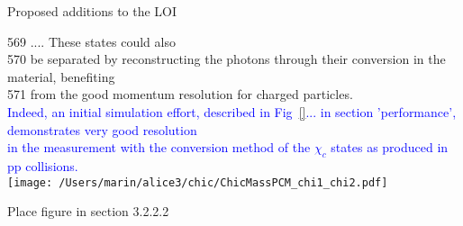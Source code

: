 \documentclass[final,hyperref={pdfpagelabels=false},aspectratio=169,t]{beamer}
\begin{document}
\begin{frame}{Proposed additions to the LOI}

{\tiny
569 .... These states could also\\
 570 be separated by reconstructing the photons through their conversion in the material, benefiting\\
 571 from the good momentum resolution for charged particles.\\
\textcolor{blue}{Indeed, an initial simulation effort, described in Fig~\ref{}... in section 'performance', demonstrates very good resolution\\
 in the measurement with the conversion method of the $\chi_c$ states as produced in pp collisions.}\\
}
\vspace{1cm}
\texttt{[image: /Users/marin/alice3/chic/ChicMassPCM\_chi1\_chi2.pdf]}

Place figure in section 3.2.2.2\\
\end{frame}
\end{document}
